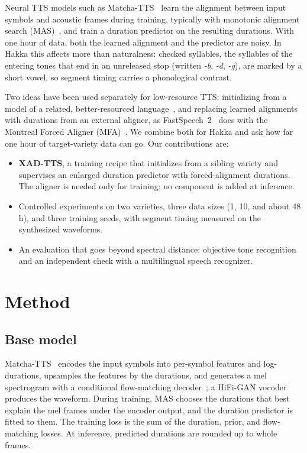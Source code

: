 \documentclass[conference,a4paper]{IEEEtran}
\begin{document}
Neural TTS models such as Matcha-TTS~\cite{mehta2024matcha} learn the alignment between input symbols and acoustic frames during training, typically with monotonic alignment search (MAS)~\cite{kim2020glow}, and train a duration predictor on the resulting durations. With one hour of data, both the learned alignment and the predictor are noisy. In Hakka this affects more than naturalness: checked syllables, the syllables of the entering tones that end in an unreleased stop (written \textit{-b}, \textit{-d}, \textit{-g}), are marked by a short vowel, so segment timing carries a phonological contrast.

Two ideas have been used separately for low-resource TTS: initializing from a model of a related, better-resourced language~\cite{chen2019crosslingual,xu2020lrspeech}, and replacing learned alignments with durations from an external aligner, as FastSpeech~2~\cite{ren2021fastspeech2} does with the Montreal Forced Aligner (MFA)~\cite{mcauliffe2017mfa}. We combine both for Hakka and ask how far one hour of target-variety data can go. Our contributions are:
\begin{itemize}
\item \textbf{XAD-TTS}, a training recipe that initializes from a sibling variety and supervises an enlarged duration predictor with forced-alignment durations. The aligner is needed only for training; no component is added at inference.
\item Controlled experiments on two varieties, three data sizes (1, 10, and about 48\,h), and three training seeds, with segment timing measured on the synthesized waveforms.
\item An evaluation that goes beyond spectral distance: objective tone recognition and an independent check with a multilingual speech recognizer.
\end{itemize}

\section{Method}

\subsection{Base model}
Matcha-TTS~\cite{mehta2024matcha} encodes the input symbols into per-symbol features and log-durations, upsamples the features by the durations, and generates a mel spectrogram with a conditional flow-matching decoder~\cite{lipman2023flow}; a HiFi-GAN vocoder~\cite{kong2020hifigan} produces the waveform. During training, MAS chooses the durations that best explain the mel frames under the encoder output, and the duration predictor is fitted to them. The training loss is the sum of the duration, prior, and flow-matching losses. At inference, predicted durations are rounded up to whole frames.
\end{document}
